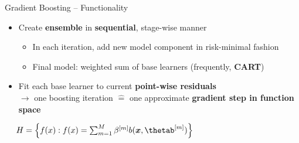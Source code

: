 \begin{frame}{Gradient Boosting -- Functionality}


\medskip


\begin{itemize}
  \item Create \textbf{ensemble} in \textbf{sequential}, stage-wise manner
  \begin{itemize}
    \item In each iteration, add new model component in risk-minimal fashion
    \item Final model: weighted sum of base learners (frequently, \textbf{CART})
  \end{itemize}
  \item Fit each base learner to current \textbf{point-wise residuals} 
  \\ $\rightarrow$ one boosting iteration $\widehat{=}$ one approximate 
  \textbf{gradient step in function space}
\end{itemize}

\medskip

 ~~
$\Hspace = \left\{ \fx: \fx = \sum_{m = 1}^M \betam b(\xv, \thetam) \right\}$


\end{frame}
